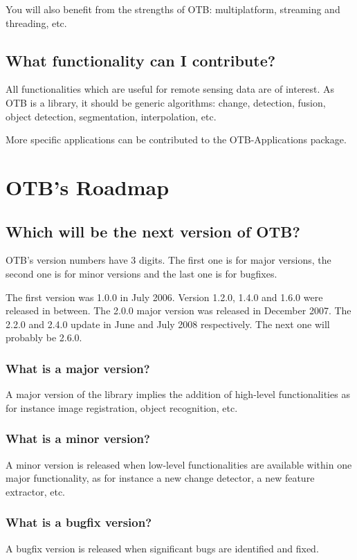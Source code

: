 You will also benefit from the strengths of OTB: multiplatform, streaming and 
threading, etc.

\subsection{What functionality can I contribute?}

All functionalities which are useful for remote sensing data are of interest. As 
OTB is a library, it should be generic algorithms: change, detection, fusion, 
object detection, segmentation, interpolation, etc.

More specific applications can be contributed to the OTB-Applications package.

\section{OTB's Roadmap}
\subsection{Which will be the next version of OTB?}
OTB's version numbers have 3 digits. The first one is for major
versions, the second one is for minor versions and the last one is for
bugfixes.

The first version was 1.0.0 in July 2006. Version 1.2.0, 1.4.0 and 1.6.0 were 
released in between. The 2.0.0 major version  was released in December 2007. 
The 2.2.0 and 2.4.0 update in June and July 2008 respectively.
The next one will probably be 2.6.0.

\subsubsection{What is a major version?}
A major version of the library implies the addition of high-level
functionalities as for instance image registration, object recognition, etc.

\subsubsection{What is a minor version?}
A minor version is released when low-level functionalities are
available within one major functionality, as for instance a new
change detector, a new feature extractor, etc.

\subsubsection{What is a bugfix version?}
A bugfix version is released when significant bugs are identified and fixed.

